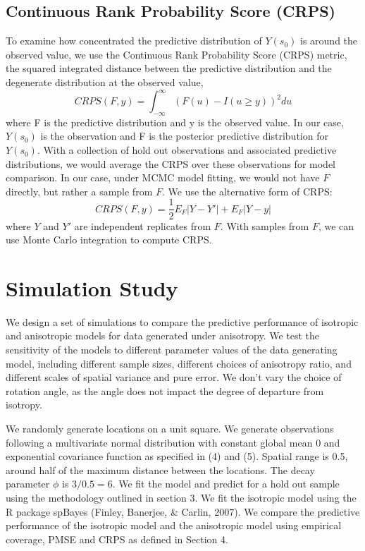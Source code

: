 \documentclass[12pt,twoside]{dukestatscithesis}
\theoremstyle{definition}
\theoremstyle{definition}
\theoremstyle{definition}
\theoremstyle{remark}
\begin{document}
\section{Continuous Rank Probability Score
(CRPS)}\label{continuous-rank-probability-score-crps}

To examine how concentrated the predictive distribution of \(Y(s_0)\) is
around the observed value, we use the Continuous Rank Probability Score
(CRPS) metric, the squared integrated distance between the predictive
distribution and the degenerate distribution at the observed value,
\begin{equation*}
CRPS(F,y) = \int_{-\infty}^{\infty}(F(u)-I(u\ge y))^2du
\end{equation*}
where F is the predictive distribution and y is the observed value. In
our case, \(Y(s_0)\) is the observation and F is the posterior
predictive distribution for \(Y(s_0)\). With a collection of hold out
observations and associated predictive distributions, we would average
the CRPS over these observations for model comparison. In our case,
under MCMC model fitting, we would not have \(F\) directly, but rather a
sample from \(F\). We use the alternative form of CRPS:
\begin{equation*}
CRPS(F,y) = \displaystyle{\frac{1}{2}}E_F|Y-Y'| + E_F|Y-y|
\end{equation*}
where \(Y\) and \(Y'\) are independent replicates from \(F\). With
samples from \(F\), we can use Monte Carlo integration to compute CRPS.

\chapter{Simulation Study}\label{simulation-study}

We design a set of simulations to compare the predictive performance of
isotropic and anisotropic models for data generated under anisotropy. We
test the sensitivity of the models to different parameter values of the
data generating model, including different sample sizes, different
choices of anisotropy ratio, and different scales of spatial variance
and pure error. We don't vary the choice of rotation angle, as the angle
does not impact the degree of departure from isotropy.

We randomly generate locations on a unit square. We generate
observations following a multivariate normal distribution with constant
global mean \(0\) and exponential covariance function as specified in
(4) and (5). Spatial range is 0.5, around half of the maximum distance
between the locations. The decay parameter \(\phi\) is \(3/0.5 = 6\). We
fit the model and predict for a hold out sample using the methodology
outlined in section 3. We fit the isotropic model using the R package
spBayes (Finley, Banerjee, \& Carlin, 2007). We compare the predictive
performance of the isotropic model and the anisotropic model using
empirical coverage, PMSE and CRPS as defined in Section 4.
\end{document}
